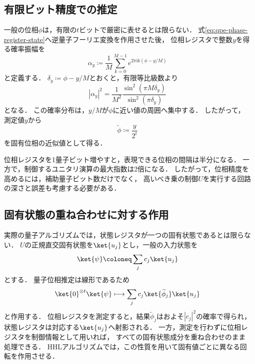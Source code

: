 \subsection{有限ビット精度での推定}
\label{subsec:qpe-finite-precision}

一般の位相$\phi$は，有限の$t$ビットで厳密に表せるとは限らない．
式\eqref{eq:qpe-phase-register-state}へ逆量子フーリエ変換を作用させた後，
位相レジスタで整数$y$を得る確率振幅を
\begin{equation}
  \alpha_y
  \coloneq
  \frac{1}{M}
  \sum_{k=0}^{M-1}
  e^{2\pi\mathrm{i}k(\phi-y/M)}
  \label{eq:qpe-finite-amplitude}
\end{equation}
と定義する．
$\delta_y\coloneq\phi-y/M$とおくと，有限等比級数より
\begin{equation}
  |\alpha_y|^2
  =
  \frac{1}{M^2}
  \frac{\sin^2(\pi M\delta_y)}
       {\sin^2(\pi\delta_y)}
  \label{eq:qpe-probability-distribution}
\end{equation}
となる．
この確率分布は，$y/M$が$\phi$に近い値の周囲へ集中する．
したがって，測定値$y$から
\begin{equation}
  \widetilde{\phi}
  \coloneq
  \frac{y}{2^t}
  \label{eq:qpe-phase-estimate}
\end{equation}
を固有位相の近似値として得る．

位相レジスタを1量子ビット増やすと，表現できる位相の間隔は半分になる．
一方で，制御するユニタリ演算の最大指数は2倍になる．
したがって，位相精度を高めるには，補助量子ビット数だけでなく，
高いべき乗の制御$U$を実行する回路の深さと誤差も考慮する必要がある．

\subsection{固有状態の重ね合わせに対する作用}
\label{subsec:qpe-superposition-input}

実際の量子アルゴリズムでは，状態レジスタが一つの固有状態であるとは限らない．
$U$の正規直交固有状態を$\ket{u_j}$とし，一般の入力状態を
\begin{equation}
  \ket{\psi}
  \coloneq
  \sum_j c_j\ket{u_j}
  \label{eq:qpe-general-input}
\end{equation}
とする．
量子位相推定は線形であるため
\begin{equation}
  \ket{0}^{\otimes t}\ket{\psi}
  \longmapsto
  \sum_j c_j
  \ket{\widetilde{\phi}_j}\ket{u_j}
  \label{eq:qpe-superposition-output}
\end{equation}
と作用する．
位相レジスタを測定すると，結果$\widetilde{\phi}_j$はおよそ$|c_j|^2$の確率で得られ，
状態レジスタは対応する$\ket{u_j}$へ射影される．
一方，測定を行わずに位相レジスタを制御情報として用いれば，
すべての固有状態成分を重ね合わせのまま処理できる．
HHLアルゴリズムでは，この性質を用いて固有値ごとに異なる回転を作用させる．

